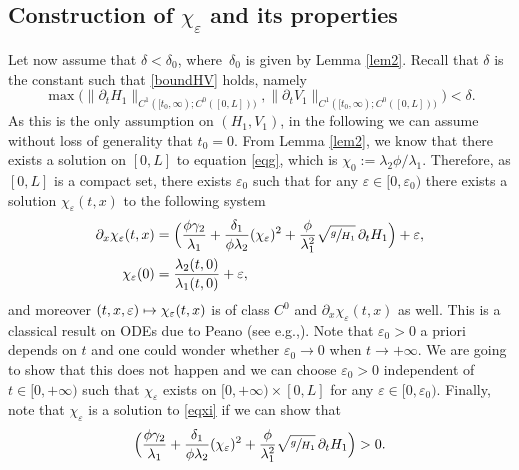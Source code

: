 \documentclass[11pt]{article}
\newcommand{\eg}{e.g.,\xspace}
\numberwithin{equation}{section}
\newcommand\mto{\mathchoice{\longmapsto}{\mapsto}{\mapsto}{\mapsto}}
\theoremstyle{definition}
\begin{document}
\subsection{Construction of $\chi_{\varepsilon}$ and its properties}
Let now assume that $\delta \!<\!\delta_{0}$, where~$\delta_{0}$ is given by Lemma \ref{lem2}. {Recall that $\delta$ is the constant such that \eqref{boundHV} holds, namely
\begin{equation*}
\max\bigl(\lVert\partial_{t}H_{1}\rVert_{C^{1}([t_{0},\infty);{C^{0}([0,L])})},\lVert\partial_{t}V_{1}\rVert_{C^{1}([t_{0},\infty);{C^{0}([0,L])})}\bigr)<\delta.
\end{equation*}
As this is the only assumption on $(H_{1},V_{1})$, in the following we can assume without loss of generality that $t_{0}=0$.}
From Lemma \ref{lem2}, we know that there exists a solution on $[0,L]$ to equation \eqref{eqg}, which is ${\chi_{0}:=}\lambda_{2}\phi/\lambda_{1}$.
Therefore, as $[0,L]$ is a compact set, there exists $\varepsilon_{{0}}$ such that
for any $\varepsilon\in[0,\varepsilon_{{0}})$ there exists a solution $\chi_{\varepsilon}(t,x)$ to the following system
\begin{equation}
\begin{split}
\partial_{x}\chi_{\varepsilon}(t,x)&=\Bigl(\frac{\phi\gamma_{2}}{\lambda_{1}}+\frac{\delta_{1}}{\phi\lambda_{2}}(\chi_{\varepsilon})^{2}+{\frac{\phi}{\lambda_{1}^{2}}}\sqrt{\sfrac{g}{H_{1}}}\,\partial_{t} H_{1} \Bigr)+\varepsilon,\\
\chi_{\varepsilon}(0)&=\frac{\lambda_{2}(t,0)}{\lambda_{1}(t,0)}+\varepsilon,
\end{split}
\label{eqf}
\end{equation}
and moreover $(t,x,\varepsilon)\mto \chi_{\varepsilon}(t,x)$ is of class $C^{0}$ and $\partial_{x}\chi_{\varepsilon}(t,x)$ as well.
This is a classical result on {ODEs} due to Peano (see \eg \cite[Chap.\,5, Th.\,3.1]{Hartman}). Note that $\varepsilon_{0}>0$ a priori depends on $t$ and one could wonder whether $\varepsilon_{0}\to 0$ when $t\to+\infty$. We are going to show that this does not happen and we can choose $\varepsilon_{0}>0$ independent of $t\in[0,+\infty)$ such that $\chi_{\varepsilon}$ exists on $[0,+\infty)\times[0,L]$ for any $\varepsilon\in[0,\varepsilon_{0})$. Finally, note that $\chi_{\varepsilon}$ is a solution to \eqref{eqxi} if we can show that
\begin{equation*}
\Bigl(\frac{\phi\gamma_{2}}{\lambda_{1}}+\frac{\delta_{1}}{\phi\lambda_{2}}(\chi_{\varepsilon})^{2}+{\frac{\phi}{\lambda_{1}^{2}}}\sqrt{\sfrac{g}{H_{1}}}\,\partial_{t} H_{1} \Bigr)>0.
\end{equation*}
\end{document}
